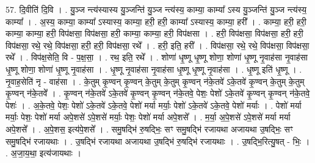 \documentclass[17pt]{extarticle}
\begin{document}
57. दि॒वीति॑ दि॒वि । . यु॒ञ्ज न्त्य॑स्यास्य यु॒ञ्जन्ति॑ यु॒ञ्ज न्त्य॑स्य॒ काम्या॒ काम्या᳚ ऽस्य यु॒ञ्जन्ति॑ यु॒ञ्ज न्त्य॑स्य॒ काम्या᳚ । . अ॒स्य॒ काम्या॒ काम्या᳚ ऽस्यास्य॒ काम्या॒ हरी॒ हरी॒ काम्या᳚ ऽस्यास्य॒ काम्या॒ हरी᳚ । . काम्या॒ हरी॒ हरी॒ काम्या॒ काम्या॒ हरी॒ विप॑क्षसा॒ विप॑क्षसा॒ हरी॒ काम्या॒ काम्या॒ हरी॒ विप॑क्षसा । . हरी॒ विप॑क्षसा॒ विप॑क्षसा॒ हरी॒ हरी॒ विप॑क्षसा॒ रथे॒ रथे॒ विप॑क्षसा॒ हरी॒ हरी॒ विप॑क्षसा॒ रथे᳚ । . हरी॒ इति॒ हरी᳚ । . विप॑क्षसा॒ रथे॒ रथे॒ विप॑क्षसा॒ विप॑क्षसा॒ रथे᳚ । . विप॑क्ष॒सेति॒ वि - प॒क्ष॒सा॒ । . रथ॒ इति॒ रथे᳚ । . शोणा॑ धृ॒ष्णू धृ॒ष्णू शोणा॒ शोणा॑ धृ॒ष्णू नृ॒वाह॑सा नृ॒वाह॑सा धृ॒ष्णू शोणा॒ शोणा॑ धृ॒ष्णू नृ॒वाह॑सा । . धृ॒ष्णू नृ॒वाह॑सा नृ॒वाह॑सा धृ॒ष्णू धृ॒ष्णू नृ॒वाह॑सा । . धृ॒ष्णू इति॑ धृ॒ष्णू । . नृ॒वाह॒सेति॑ नृ - वाह॑सा । . के॒तुम् कृ॒ण्वन् कृ॒ण्वन् के॒तुम् के॒तुम् कृ॒ण्वन् न॑के॒तवे॑ ऽके॒तवे॑ कृ॒ण्वन् के॒तुम् के॒तुम् कृ॒ण्वन् न॑के॒तवे᳚ । . कृ॒ण्वन् न॑के॒तवे॑ ऽके॒तवे॑ कृ॒ण्वन् कृ॒ण्वन् न॑के॒तवे॒ पेशः॒ पेशो॑ ऽके॒तवे॑ कृ॒ण्वन् कृ॒ण्वन् न॑के॒तवे॒ पेशः॑ । . अ॒के॒तवे॒ पेशः॒ पेशो॑ ऽके॒तवे॑ ऽके॒तवे॒ पेशो॑ मर्या मर्याः॒ पेशो॑ ऽके॒तवे॑ ऽके॒तवे॒ पेशो॑ मर्याः । . पेशो॑ मर्या मर्याः॒ पेशः॒ पेशो॑ मर्या अपे॒शसे॑ ऽपे॒शसे॑ मर्याः॒ पेशः॒ पेशो॑ मर्या अपे॒शसे᳚ । . म॒र्या॒ अ॒पे॒शसे॑ ऽपे॒शसे॑ मर्या मर्या अपे॒शसे᳚ । . अ॒पे॒शस॒ इत्य॑पे॒शसे᳚ । . समु॒षद्भि॑ रु॒षद्भिः॒ सꣳ समु॒षद्भि॑ रजायथा अजायथा उ॒षद्भिः॒ सꣳ समु॒षद्भि॑ रजायथाः । . उ॒षद्भि॑ रजायथा अजायथा उ॒षद्भि॑ रु॒षद्भि॑ रजायथाः । . उ॒षद्भि॒रित्यु॒षत् - भिः॒ । . अ॒जा॒य॒था॒ इत्य॑जायथाः । \newline
\pagebreak
{}
\end{document}
